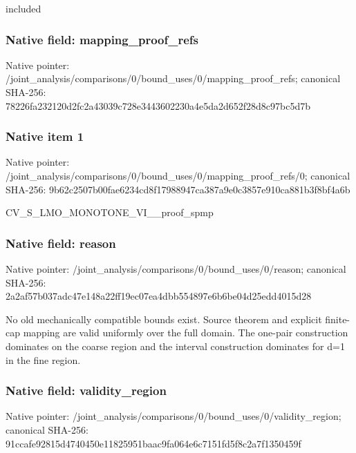 \documentclass[10pt,a4paper]{article}
\begin{document}
\begingroup\raggedright\sloppy included\par\endgroup

\subsubsection{Native field: mapping\_\allowbreak{}proof\_\allowbreak{}refs}
Native pointer: /joint\_\allowbreak{}analysis/comparisons/0/bound\_\allowbreak{}uses/0/mapping\_\allowbreak{}proof\_\allowbreak{}refs; canonical SHA-256: 78226fa232120d2fc2a43039c728e3443602230a4e5da2d652f28d8c97bc5d7b

\subsubsection{Native item 1}
Native pointer: /joint\_\allowbreak{}analysis/comparisons/0/bound\_\allowbreak{}uses/0/mapping\_\allowbreak{}proof\_\allowbreak{}refs/0; canonical SHA-256: 9b62c2507b00fae6234cd8f17988947ca387a9e0c3857e910ca881b3f8bf4a6b

\begingroup\raggedright\sloppy CV\_\allowbreak{}S\_\allowbreak{}LMO\_\allowbreak{}MONOTONE\_\allowbreak{}VI\_\allowbreak{}\_\allowbreak{}proof\_\allowbreak{}spmp\par\endgroup

\subsubsection{Native field: reason}
Native pointer: /joint\_\allowbreak{}analysis/comparisons/0/bound\_\allowbreak{}uses/0/reason; canonical SHA-256: 2a2af57b037adc47e148a22ff19ec07ea4dbb554897e6b6be04d25edd4015d28

\begingroup\raggedright\sloppy No old mechanically compatible bounds exist. Source theorem and explicit finite-cap mapping are valid uniformly over the full domain. The one-pair construction dominates on the coarse region and the interval construction dominates for d=\allowbreak{}1 in the fine region.\par\endgroup

\subsubsection{Native field: validity\_\allowbreak{}region}
Native pointer: /joint\_\allowbreak{}analysis/comparisons/0/bound\_\allowbreak{}uses/0/validity\_\allowbreak{}region; canonical SHA-256: 91ccafe92815d4740450e11825951baac9fa064e6c7151fd5f8c2a7f1350459f
\end{document}
